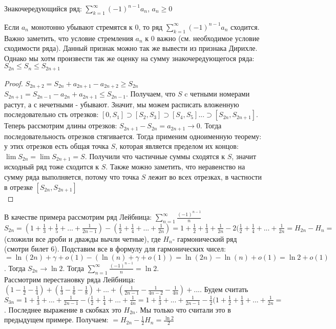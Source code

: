 
Знакочередующийся ряд: $\sum_{k=1}^{\infty} (-1)^{n-1}a_n$, $a_n \ge 0$

\begin{theorem}\thmslashn

Если $a_n$ монотонно убывают стремятся к 0, то ряд $\sum_{k=1}^{\infty} (-1)^{n-1}a_n$ сходится. Важно заметить, что условие стремления $a_n$ к 0 важно (см. необходимое условие сходимости ряда). Данный признак можно так же вывести из признака Дирихле. Однако мы хотм произвести так же оценку на сумму знакочередующегося ряда: $S_{2n} \le S_n \le S_{2n+1}$
\end{theorem}

\begin{proof}\thmslashn

$S_{2n+2}=S_{2n}+a_{2n+1}-a_{2n+2} \ge S_{2n}$
 $S_{2n+1}=S_{2n-1}-a_{2n}+a_{2n+1} \le S_{2n-1}$. Получаем, что $S$ c четными номерами растут, а с нечетными - убывают. Значит, мы можем расписать вложенную последовательно	сть отрезков: $[0,S_1] \supset [S_2,S_3] \supset [S_4,S_5]... \supset [S_{2n}, S_{2n+1}]$.\\ Теперь рассмотрим длины отрезков: $S_{2n+1}-S_{2n}=a_{2n+1} \to 0$. Тогда последовательность отрезков стягивается. Тогда применим одноименную теорему: у этих отрезков есть общая точка $S$, которая является пределом их концов: $\lim S_{2n} = \lim S_{2n+1} = S$. Получили что частичные суммы сходятся к $S$, значит исходный ряд тоже сходится к $S$. Также можно заметить, что неравенство на сумму ряда выполняется, потому что точка  $S$ лежит во всех отрезках, в частности в отрезке $[S_{2n}, S_{2n+1}]$\\
\end{proof}

\begin{example}\thmslashn

 В качестве примера рассмотрим ряд Лейбница: $\sum_{n=1}^\infty \frac{(-1)^{n-1}}{n} $ \\
 $S_{2n} = (1+ \frac{1}{3} + \frac{1}{5} + ... + \frac{1}{2n-1})-(\frac{1}{2}+ \frac{1}{4}+... + \frac{1}{2n}) = 1+ \frac{1}{2}+ \frac{1}{3}+ \frac{1}{2n} -2(\frac{1}{2}+\frac{1}{4}+...+ \frac{1}{2n}=H_{2n}-H_n=$ (сложили все дроби и дважды вычли четные), где $H_n$- гармонический ряд (смотри билет 6). Подставим все в формулу для гармонических чисел: $=\ln(2n)+ \gamma +o(1)-(\ln(n) + \gamma + o(1)) = \ln(2n) - \ln(n) + o(1) = \ln 2 + o(1)$. Тогда $S_{2n} \to \ln 2$. Тогда $\sum_{n=1}^\infty \frac{(-1)^{n-1}}{n}= \ln 2 $. \\
 Рассмотрим перестановку ряда Лейбница: $(1-\frac{1}{2}-\frac{1}{4})+(\frac{1}{3}-\frac{1}{6}-\frac{1}{8})+...+(\frac{1}{2n-1}-\frac{1}{4n-2}-\frac{1}{4n})+...$.
Будем считать $S_{3n} = 1+\frac{1}{3} + ... +\frac{1}{2n-1} -(\frac{1}{2}+\frac{1}{4}+...+\frac{1}{4n} = 1+\frac{1}{3} + ... +\frac{1}{2n-1} -\frac{1}{2}(1+\frac{1}{2}+\frac{1}{3}+...+\frac{1}{2n}=$. Последнее выражение в скобках это $H_{2n}$. Мы только что считали это в предыдущем примере. Получаем: $=H_{2n}-\frac{1}{2}H_n=\frac{\ln 2}{2}$
\end{example}